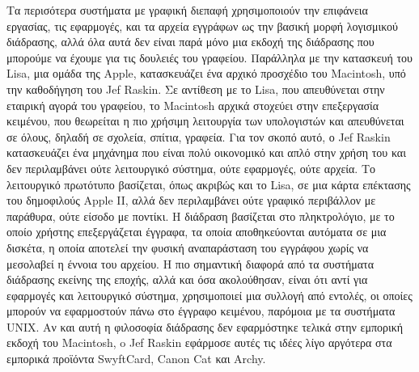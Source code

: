 \documentclass[
]{article}
\begin{document}
Τα περισότερα συστήματα με γραφική διεπαφή χρησιμοποιούν την επιφάνεια
εργασίας, τις εφαρμογές, και τα αρχεία εγγράφων ως την βασική μορφή
λογισμικού διάδρασης, αλλά όλα αυτά δεν είναι παρά μόνο μια εκδοχή της
διάδρασης που μπορούμε να έχουμε για τις δουλειές του γραφείου.
Παράλληλα με την κατασκευή του Lisa, μια ομάδα της Apple, κατασκευάζει
ένα αρχικό προσχέδιο του Macintosh, υπό την καθοδήγηση του Jef Raskin.
Σε αντίθεση με το Lisa, που απευθύνεται στην εταιρική αγορά του
γραφείου, το Macintosh αρχικά στοχεύει στην επεξεργασία κειμένου, που
θεωρείται η πιο χρήσιμη λειτουργία των υπολογιστών και απευθύνεται σε
όλους, δηλαδή σε σχολεία, σπίτια, γραφεία. Για τον σκοπό αυτό, ο Jef
Raskin κατασκευάζει ένα μηχάνημα που είναι πολύ οικονομικό και απλό στην
χρήση του και δεν περιλαμβάνει ούτε λειτουργικό σύστημα, ούτε εφαρμογές,
ούτε αρχεία. Το λειτουργικό πρωτότυπο βασίζεται, όπως ακριβώς και το
Lisa, σε μια κάρτα επέκτασης του δημοφιλούς Apple II, αλλά δεν
περιλαμβάνει ούτε γραφικό περιβάλλον με παράθυρα, ούτε είσοδο με
ποντίκι. Η διάδραση βασίζεται στο πληκτρολόγιο, με το οποίο χρήστης
επεξεργάζεται έγγραφα, τα οποία αποθηκεύονται αυτόματα σε μια δισκέτα, η
οποία αποτελεί την φυσική αναπαράσταση του εγγράφου χωρίς να μεσολαβεί η
έννοια του αρχείου. Η πιο σημαντική διαφορά από τα συστήματα διάδρασης
εκείνης της εποχής, αλλά και όσα ακολούθησαν, είναι ότι αντί για
εφαρμογές και λειτουργικό σύστημα, χρησιμοποιεί μια συλλογή από εντολές,
οι οποίες μπορούν να εφαρμοστούν πάνω στο έγγραφο κειμένου, παρόμοια με
τα συστήματα UNIX. Αν και αυτή η φιλοσοφία διάδρασης δεν εφαρμόστηκε
τελικά στην εμπορική εκδοχή του Macintosh, o Jef Raskin εφάρμοσε αυτές
τις ιδέες λίγο αργότερα στα εμπορικά προϊόντα SwyftCard, Canon Cat και
Archy.
\end{document}
